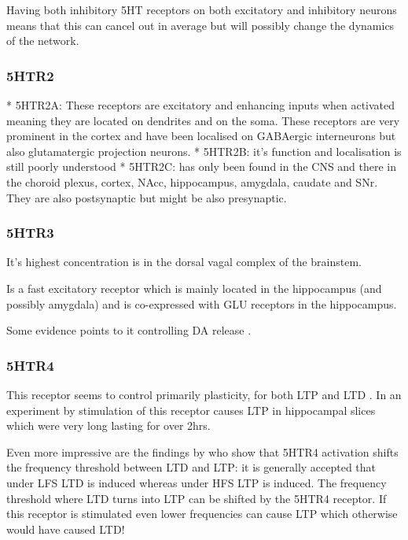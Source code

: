 \documentclass[12pt,a4paper]{article}
\begin{document}
Having both inhibitory 5HT receptors on both excitatory and inhibitory neurons means that this can cancel out in average but will possibly change the dynamics of the network.

\subsubsection{5HTR2}

  * 5HTR2A: These receptors are excitatory and enhancing inputs when activated meaning they are located on dendrites and on the soma. These receptors are very prominent in the cortex and have been localised on GABAergic interneurons but also glutamatergic projection neurons.
  * 5HTR2B: it's function and localisation is still poorly understood
  * 5HTR2C: has only been found in the CNS and there in the choroid plexus, cortex, NAcc, hippocampus, amygdala, caudate and SNr. They are also postsynaptic but might be also presynaptic.

\subsubsection{5HTR3}

It's highest concentration is in the dorsal vagal complex of the brainstem. 

Is a fast excitatory receptor which is mainly located in the hippocampus (and possibly amygdala) \citep{Palacios1990} and is co-expressed with GLU receptors in the hippocampus.

Some evidence points to it controlling DA release \citep{Mengod2010}.

\subsubsection{5HTR4}

This receptor seems to control primarily plasticity, for both LTP and LTD \citep{Penas-Cazorla2015}. In an experiment by \citep{Mlinar2006} stimulation of this receptor causes LTP in hippocampal slices which were very long lasting for over 2hrs.

Even more impressive are the findings by \citep{Hagena2017} who show that 5HTR4 activation shifts the frequency threshold between LTD and LTP: it is generally accepted that under LFS LTD is induced whereas under HFS LTP is induced. The frequency threshold where LTD turns into LTP can be shifted by the 5HTR4 receptor. If this receptor is stimulated even lower frequencies can cause LTP which otherwise would have caused LTD!
\end{document}
